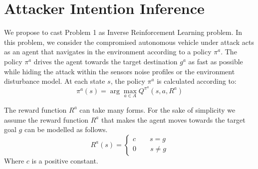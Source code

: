 \documentclass[conference]{IEEEtran}
\begin{document}
\section{Attacker Intention Inference}\label{sec:intpredic}
We propose to cast Problem 1 as Inverse Reinforcement Learning problem. In this problem, we consider the compromised autonomous vehicle under attack acts as an agent that navigates in the environment according to a policy $\pi^a$. The policy $\pi^a$ drives the agent towards the target destination $g^a$ as fast as possible while hiding the attack within the sensors noise profiles or the environment disturbance model. At each state $s$, the policy $\pi^a$ is calculated according to:
\[ \pi^a(s) = \arg\!\max_{a\in A} Q^{\pi^a}(s,a,R^a)\]

The reward function $R^a$ can take many forms. For the sake of simplicity we assume the reward function $R^a$ that makes the agent moves towards the target goal $g$ can be modelled as follows. 
  \begin{equation}
    R^a(s)=\left\{
                \begin{array}{ll}
                  c\hspace{2em} s = g\\
                  0\hspace{2em} s \ne g
                \end{array}
              \right.
  \end{equation}
Where $c$ is a positive constant.
\end{document}
